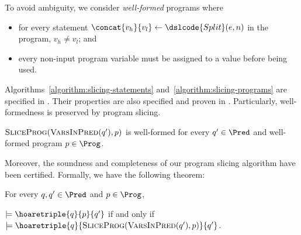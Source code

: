 To avoid ambiguity, we consider \emph{well-formed} programs where
\begin{itemize}
\item for every statement $\concat{v_h}{v_l} \leftarrow
  \dslcode{Split}(e, n)$ in the program, $v_h \neq v_l$; and
\item every non-input program variable must be assigned to a value
  before being used. 
\end{itemize}
Algorithms~\ref{algorithm:slicing-statements}
and~\ref{algorithm:slicing-programs} are specified in \gallina. Their
properties are also specified and proven in \coq. 
Particularly, well-formedness is preserved by program slicing.
\begin{lemma}
  $\textsc{SliceProg}(\textsc{VarsInPred}(q'), p)$ is well-formed
  for every $q' \in \Pred$ and well-formed program $p \in \Prog$.
  \label{lemma:slicing-well-formed}
\end{lemma}

Moreover, the
soundness and completeness of our program slicing algorithm have been
certified. Formally, we have the following theorem:

\begin{theorem}
  For every $q, q' \in \Pred$ and $p \in \Prog$,
  \begin{center}
  $\models \hoaretriple{q}{p}{q'}$ if and only if
  $\models \hoaretriple{q}{\textsc{SliceProg}(\textsc{VarsInPred}(q'), p)}
  {q'}$.
  \end{center}
  \label{theorem:program-slicing}
\end{theorem}
